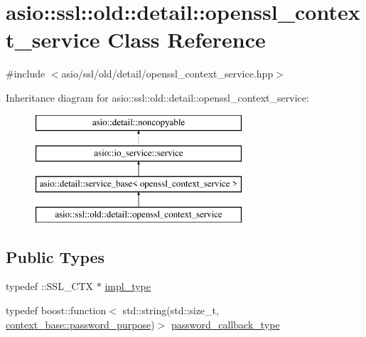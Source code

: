 \hypertarget{classasio_1_1ssl_1_1old_1_1detail_1_1openssl__context__service}{}\section{asio\+:\+:ssl\+:\+:old\+:\+:detail\+:\+:openssl\+\_\+context\+\_\+service Class Reference}
\label{classasio_1_1ssl_1_1old_1_1detail_1_1openssl__context__service}


{\ttfamily \#include $<$asio/ssl/old/detail/openssl\+\_\+context\+\_\+service.\+hpp$>$}

Inheritance diagram for asio\+:\+:ssl\+:\+:old\+:\+:detail\+:\+:openssl\+\_\+context\+\_\+service\+:\begin{figure}[H]
\begin{center}
\leavevmode
\includegraphics[height=4.000000cm]{classasio_1_1ssl_1_1old_1_1detail_1_1openssl__context__service}
\end{center}
\end{figure}
\subsection*{Public Types}
\begin{DoxyCompactItemize}
\item 
typedef \+::S\+S\+L\+\_\+\+C\+T\+X $\ast$ \hyperlink{classasio_1_1ssl_1_1old_1_1detail_1_1openssl__context__service_a1287914e0f48a9098c9141ca33ecd570}{impl\+\_\+type}
\item 
typedef boost\+::function$<$ std\+::string(std\+::size\+\_\+t, \hyperlink{classasio_1_1ssl_1_1context__base_a0e5aec1cd0f3db28becde1dca686c855}{context\+\_\+base\+::password\+\_\+purpose})$>$ \hyperlink{classasio_1_1ssl_1_1old_1_1detail_1_1openssl__context__service_aca3250c5d335efd54d1b3b7a49ed22a8}{password\+\_\+callback\+\_\+type}
\end{DoxyCompactItemize}
